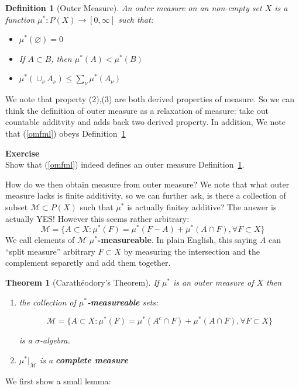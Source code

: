 \documentclass[a4paper,11pt,oneside]{book}
\newtheorem{theorem}{Theorem}[section]
\newtheorem{definition}{Definition}[section]
\begin{document}
\begin{definition}[Outer Measure]\label{omdf}An outer measure on an non-empty set $X$ is a function $\mu^* : P(X)\to [0,\infty]$ such that:

\begin{itemize}
\item $\mu^*(\varnothing)=0$
\item If $A\subset B$, then $\mu^*(A)<\mu^*(B)$
\item $\mu^*(\cup_{\nu}A_{\nu})\leq \sum_{\nu} \mu^* (A_{\nu })$
\end{itemize}

\end{definition}We note that property (2),(3) are both derived properties of measure. So we can think the definition of outer measure as a relaxation of measure: take out countable additvity and adds back two derived property. In addition,  We note that (\ref{omfml}) obeys Definition~\ref{omdf}

\begin{framed}
\textbf{Exercise}\\
Show that (\ref{omfml}) indeed defines an outer measure Definition~\ref{omdf}.
\end{framed}

How do we then obtain measure from outer measure? We note that what outer measure lacks is finite additivity, so we can further ask, is there a collection of subset $\mathcal {M}\subset P(X)$ such that $\mu^*$ is actually finitey additive? The answer is actually YES! However this seems rather arbitrary:
\begin{equation}
\mathcal M = \{A\subset X: \mu^*(F)=\mu^*(F-A)+\mu^*(A\cap F), \forall F \subset X\}
\end{equation}
We call elements of $\mathcal M$ \textbf{$\mu^*$-measureable}. In plain English, this saying $A$ can ``split measure'' arbitrary $F\subset X$ by measuring the intersection and the complement separetly and add them together.

\begin{theorem}[Carathéodory’s Theorem]If $\mu^*$ is an outer measure of $X$ then

\begin{enumerate}
\item the collection of \textbf{$\mu^*$-measureable} sets:

\begin{equation}
\mathcal M = \{A\subset X: \mu^*(F)=\mu^*(A^c \cap F)+\mu^*(A\cap F), \forall F \subset X\}
\end{equation}


is a $\sigma$-algebra.


\item $\mu^*|_{\mathcal M}$ is a \textbf{complete measure}
\end{enumerate}

\end{theorem}We first show a small lemma:
\end{document}
